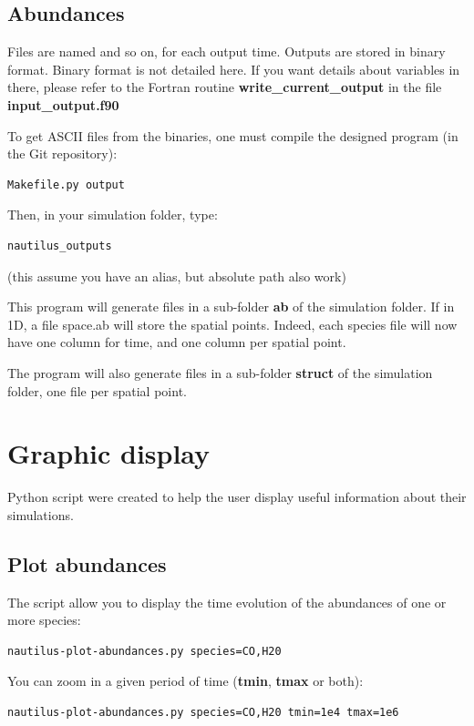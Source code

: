 \documentclass[english,a4paper,twoside]{article}
\begin{document}
\subsection{Abundances}\label{sec:abundances}
Files are named  and so on, for each output time. Outputs are stored in binary format. Binary format is not detailed here. If you want details about variables in there, please refer to the Fortran routine \textbf{write\_current\_output} in the file \textbf{input\_output.f90}

To get ASCII files from the binaries, one must compile the designed program (in the Git repository):
\begin{verbatim}
Makefile.py output
\end{verbatim}

Then, in your simulation folder, type:
\begin{verbatim}
nautilus_outputs
\end{verbatim}
(this assume you have an alias, but absolute path also work)

This program will generate  files in a sub-folder \textbf{ab} of the simulation folder. If in 1D, a file space.ab will store the spatial points. Indeed, each species file will now have one column for time, and one column per spatial point.

The program will also generate  files in a sub-folder \textbf{struct} of the simulation folder, one file per spatial point. 

\section{Graphic display}\label{sec:graphic-display}
Python script were created to help the user display useful information about their simulations. 

\subsection{Plot abundances}
The script  allow you to display the time evolution of the abundances of one or more species:
\begin{verbatim}
nautilus-plot-abundances.py species=CO,H20
\end{verbatim}

You can zoom in a given period of time (\textbf{tmin}, \textbf{tmax} or both):
\begin{verbatim}
nautilus-plot-abundances.py species=CO,H20 tmin=1e4 tmax=1e6
\end{verbatim}
\end{document}
